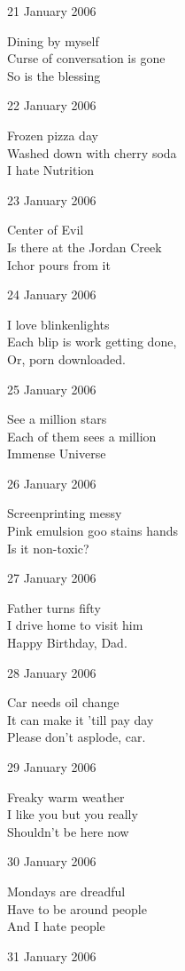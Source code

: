 \documentclass[12pt]{article}
\begin{document}
21 January 2006

Dining by myself \\
Curse of conversation is gone \\
So is the blessing

22 January 2006

Frozen pizza day \\
Washed down with cherry soda \\
I hate Nutrition

23 January 2006

Center of Evil \\
Is there at the Jordan Creek \\
Ichor pours from it

24 January 2006

I love blinkenlights \\
Each blip is work getting done, \\
Or, porn downloaded.

25 January 2006

See a million stars \\
Each of them sees a million \\
Immense Universe


\newpage

26 January 2006

Screenprinting messy \\
Pink emulsion goo stains hands \\
Is it non-toxic?

27 January 2006

Father turns fifty \\
I drive home to visit him \\
Happy Birthday, Dad.

28 January 2006

Car needs oil change \\
It can make it 'till pay day \\
Please don't asplode, car.

29 January 2006

Freaky warm weather \\
I like you but you really \\
Shouldn't be here now

30 January 2006

Mondays are dreadful \\
Have to be around people \\
And I hate people

31 January 2006
\end{document}

